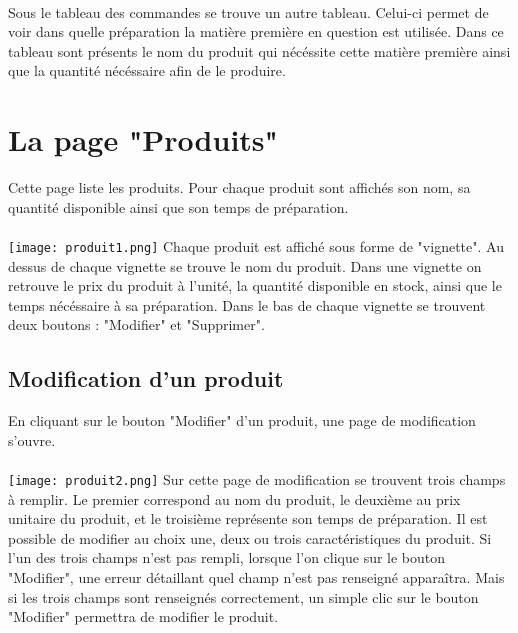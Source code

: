 \paragraph{}
Sous le tableau des commandes se trouve un autre tableau. Celui-ci permet de 
voir dans quelle préparation la matière première en question est utilisée. Dans 
ce tableau sont présents le nom du produit qui nécéssite cette matière première 
ainsi que la quantité nécéssaire afin de le produire.



\section{La page "Produits"}
Cette page liste les produits. Pour chaque produit sont affichés son nom, sa 
quantité disponible ainsi que son temps de préparation.

\paragraph{}
\texttt{[image: produit1.png]}
Chaque produit est affiché sous forme de "vignette". Au dessus de chaque 
vignette se trouve le nom du produit. Dans une vignette on retrouve le prix du 
produit à l'unité, la quantité disponible en stock, ainsi que le temps nécéssaire 
à sa préparation. Dans le bas de chaque vignette se trouvent deux boutons : 
"Modifier" et "Supprimer".

\subsection{Modification d'un produit}
En cliquant sur le bouton "Modifier" d'un produit, une page de modification 
s'ouvre. 

\paragraph{}
\texttt{[image: produit2.png]}
Sur cette page de modification se trouvent trois champs à remplir. 
Le premier correspond au nom du produit, le deuxième au prix unitaire du produit, 
et le troisième représente son temps de préparation. Il est possible de modifier 
au choix une, deux ou trois caractéristiques du produit. Si l'un des trois champs 
n'est pas rempli, lorsque l'on clique sur le bouton "Modifier", une erreur 
détaillant quel champ n'est pas renseigné apparaîtra. Mais si les trois champs 
sont renseignés correctement, un simple clic sur le bouton "Modifier" permettra 
de modifier le produit.


